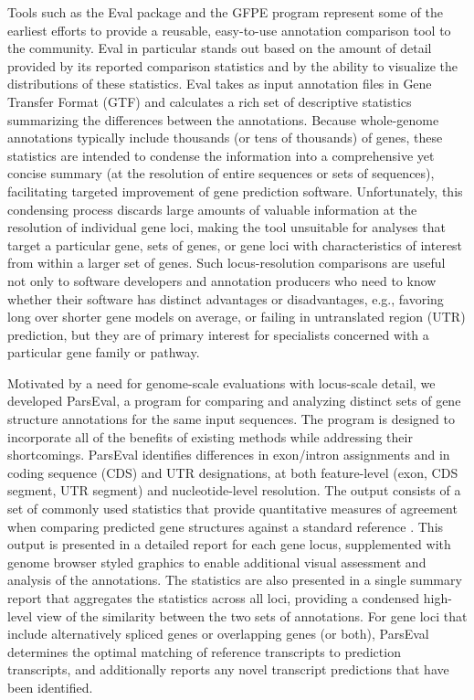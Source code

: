 Tools such as the Eval package \citep{Keibler} and the GFPE program \citep{Wang} represent some of the earliest efforts to provide a reusable, easy-to-use annotation comparison tool to the community.
Eval in particular stands out based on the amount of detail provided by its reported comparison statistics and by the ability to visualize the distributions of these statistics.
Eval takes as input annotation files in Gene Transfer Format (GTF) and calculates a rich set of descriptive statistics summarizing the differences between the annotations.
Because whole-genome annotations typically include thousands (or tens of thousands) of genes, these statistics are intended to condense the information into a comprehensive yet concise summary (at the resolution of entire sequences or sets of sequences), facilitating targeted improvement of gene prediction software.
Unfortunately, this condensing process discards large amounts of valuable information at the resolution of individual gene loci, making the tool unsuitable for analyses that target a particular gene, sets of genes, or gene loci with characteristics of interest from within a larger set of genes.
Such locus-resolution comparisons are useful not only to software developers and annotation producers who need to know whether their software has distinct advantages or disadvantages, e.g., favoring long over shorter gene models on average, or failing in untranslated region (UTR) prediction, but they are of primary interest for specialists concerned with a particular gene family or pathway.

Motivated by a need for genome-scale evaluations with locus-scale detail, we developed ParsEval, a program for comparing and analyzing distinct sets of gene structure annotations for the same input sequences.
The program is designed to incorporate all of the benefits of existing methods while addressing their shortcomings.
ParsEval identifies differences in exon/intron assignments and in coding sequence (CDS) and UTR designations, at both feature-level (exon, CDS segment, UTR segment) and nucleotide-level resolution.
The output consists of a set of commonly used statistics that provide quantitative measures of agreement when comparing predicted gene structures against a standard reference \citep{Burset,Zhao,Eilbeck}.
This output is presented in a detailed report for each gene locus, supplemented with genome browser styled graphics to enable additional visual assessment and analysis of the annotations.
The statistics are also presented in a single summary report that aggregates the statistics across all loci, providing a condensed high-level view of the similarity between the two sets of annotations.
For gene loci that include alternatively spliced genes or overlapping genes (or both), ParsEval determines the optimal matching of reference transcripts to prediction transcripts, and additionally reports any novel transcript predictions that have been identified.

